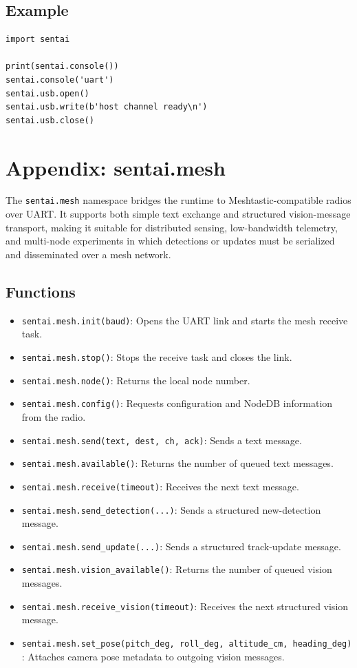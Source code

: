 \subsection{Example}\label{example-10}

\begin{verbatim}
import sentai

print(sentai.console())
sentai.console('uart')
sentai.usb.open()
sentai.usb.write(b'host channel ready\n')
sentai.usb.close()
\end{verbatim}

\section{Appendix: sentai.mesh}\label{appendix-sentai.mesh}

The \texttt{sentai.mesh} namespace bridges the runtime to
Meshtastic-compatible radios over UART. It supports both simple text
exchange and structured vision-message transport, making it suitable for
distributed sensing, low-bandwidth telemetry, and multi-node experiments
in which detections or updates must be serialized and disseminated over
a mesh network.

\subsection{Functions}\label{functions-11}

\begin{itemize}
\tightlist
\item
  \texttt{sentai.mesh.init(baud)}: Opens the UART link and starts the
  mesh receive task.
\item
  \texttt{sentai.mesh.stop()}: Stops the receive task and closes the
  link.
\item
  \texttt{sentai.mesh.node()}: Returns the local node number.
\item
  \texttt{sentai.mesh.config()}: Requests configuration and NodeDB
  information from the radio.
\item
  \texttt{sentai.mesh.send(text,\ dest,\ ch,\ ack)}: Sends a text
  message.
\item
  \texttt{sentai.mesh.available()}: Returns the number of queued text
  messages.
\item
  \texttt{sentai.mesh.receive(timeout)}: Receives the next text message.
\item
  \texttt{sentai.mesh.send\_detection(...)}: Sends a structured
  new-detection message.
\item
  \texttt{sentai.mesh.send\_update(...)}: Sends a structured
  track-update message.
\item
  \texttt{sentai.mesh.vision\_available()}: Returns the number of queued
  vision messages.
\item
  \texttt{sentai.mesh.receive\_vision(timeout)}: Receives the next
  structured vision message.
\item
  \texttt{sentai.mesh.set\_pose(pitch\_deg,\ roll\_deg,\ altitude\_cm,\ heading\_deg)}:
  Attaches camera pose metadata to outgoing vision messages.
\end{itemize}

